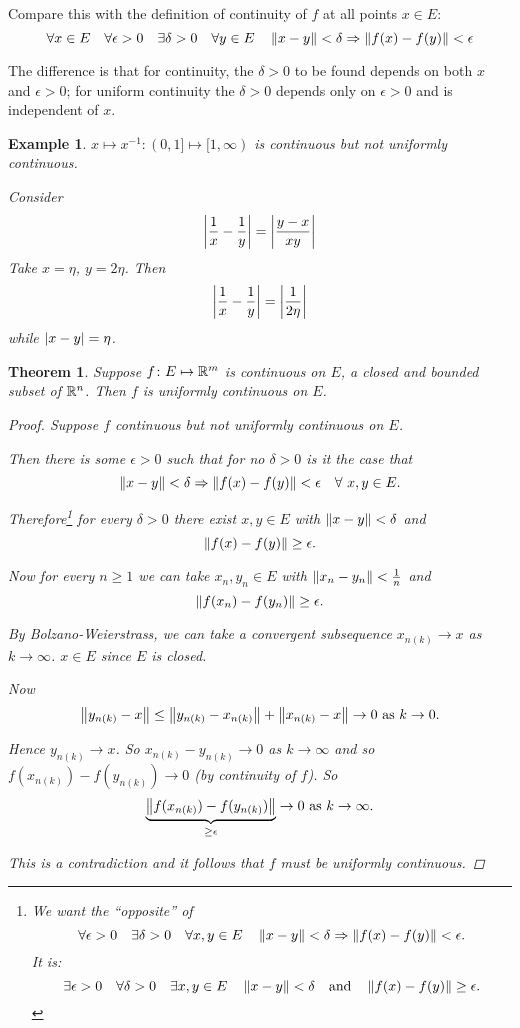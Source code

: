 \documentclass{notes}
\theoremstyle{plain}
\newtheorem{theorem}[proposition]{Theorem}
\newtheorem{example}[proposition]{Example}
\newcommand{\Forall}[1]{\forall #1 \quad}
\newcommand{\Exists}[1]{\exists #1 \quad}
\begin{document}
Compare this with the definition of continuity of $ f $ at all points
$ x \in E $:
\[
\Forall{x \in E} \Forall{\epsilon>0} \Exists{\delta>0} \Forall{y \in 
E} \norm{x-y}<\delta \Rightarrow \norm{f(x)-f(y)}<\epsilon
\]

The difference is that for continuity, the $ \delta>0 $ to be found 
depends on both $ x $ and $ \epsilon > 0 $; for uniform 
continuity the $ \delta>0 $ depends only on $ \epsilon>0 $ and 
is independent of $ x $.

\begin{example}
$x \mapsto x^{-1} : (0,1]\mapsto [1,\infty)$ is continuous 
but \emph{not} uniformly continuous.

Consider \[ \left|\frac{1}{x}-\frac{1}{y} \right| = \left|
\frac{y-x}{xy} \right| \] Take $ x = \eta $, $ y = 2 \eta $. 
Then \[ \left|\frac{1}{x}-\frac{1}{y}\right| = \left| 
\frac{1}{2\eta} \right| \] while $ \left|x-y\right|= \eta $.
\end{example}

\begin{theorem}
\label{uniformctsthm}
Suppose $ f\colon  E \mapsto \mathbb{R}^{m} $ is continuous on $ E $, a 
closed and bounded subset of $ \mathbb{R}^{n} $. Then $ f $ is uniformly 
continuous on $ E $.
\begin{proof}
Suppose $ f $ continuous but not uniformly continuous on $ E $.

Then there is some $ \epsilon>0 $ such that for no $ \delta>0 $ 
is it the case that
\[ \left\|x-y\right\|<\delta \Rightarrow 
\left\|f(x)-f(y)\right\|<\epsilon \quad \forall\  x,y \in E.
\]

Therefore\footnote{%
We want the ``opposite'' of
\[ \Forall{\epsilon>0} \Exists{ 
\delta>0} \Forall{x,y \in E} \norm{x-y}<\delta \Rightarrow 
\norm{f(x)-f(y)}<\epsilon. \] It is: \[ \Exists{\epsilon>0} \Forall{
\delta >0} \Exists
{x,y \in E} \norm{x-y}< \delta \quad \text{and} \quad 
\norm{f(x)-f(y)} \geq \epsilon. \]}
for every $ \delta>0 $ there exist $ x,y \in E $ with
$\left\|x-y\right\|<\delta$ and
\[
\left\|f(x)-f(y)\right\|\geq \epsilon.
\]

Now for every $ n \geq 1 $ we can take $ x_{n}, y_{n} \in E $ 
with $\left\|x_{n}-y_{n}\right\|< \frac{1}{n}$ and
\[
\left\|f(x_{n})-f(y_{n})\right\| \geq \epsilon.
\]

By Bolzano-Weierstrass, we can take a convergent subsequence $ 
x_{n(k)}\to x $ as $ k \to \infty $. $ x \in E $ since $E$ is closed.

Now
\[
\left\|y_{n(k)}-x\right\| \leq \left\|y_{n(k)}-x_{n(k)}\right\| + 
\left\|x_{n(k)}-x\right\|\to 0 \text{ as }  k \to 0.
\]

Hence $ y_{n(k)} \to x $. So $x_{n(k)}-y_{n(k)} \to 0$ as $ k \to 
\infty $ and so $f(x_{n(k)}) - f(y_{n(k)}) \to 0$ (by continuity of $ f $). 
So
\[
\underbrace{\left\|f(x_{n(k)})-f(y_{n(k)})\right\|}_{\geq 
\epsilon}\to 0 \text{ as } k \to \infty.
\]

This is a contradiction and it follows that $ f $ must be uniformly
continuous.
\end{proof}
\end{theorem}
\end{document}
